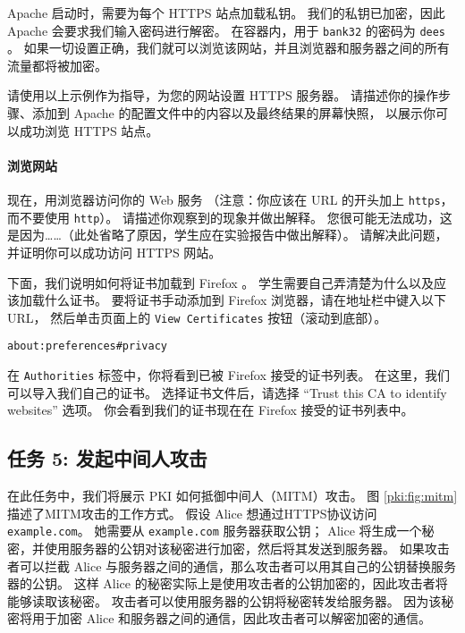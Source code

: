 Apache 启动时，需要为每个 HTTPS 站点加载私钥。
我们的私钥已加密，因此 Apache 会要求我们输入密码进行解密。
在容器内，用于 \texttt{bank32} 的密码为 \texttt{dees} 。
如果一切设置正确，我们就可以浏览该网站，并且浏览器和服务器之间的所有流量都将被加密。

请使用以上示例作为指导，为您的网站设置 HTTPS 服务器。
请描述你的操作步骤、添加到 Apache 的配置文件中的内容以及最终结果的屏幕快照，
以展示你可以成功浏览 HTTPS 站点。

\paragraph{浏览网站}
现在，用浏览器访问你的 Web 服务
（注意：你应该在 URL 的开头加上 \texttt{https}，而不要使用 \texttt{http}）。
请描述你观察到的现象并做出解释。
您很可能无法成功，这是因为……（此处省略了原因，学生应在实验报告中做出解释）。
请解决此问题，并证明你可以成功访问 HTTPS 网站。

下面，我们说明如何将证书加载到 Firefox 。
学生需要自己弄清楚为什么以及应该加载什么证书。
要将证书手动添加到 Firefox 浏览器，请在地址栏中键入以下URL，
然后单击页面上的 \texttt{View Certificates} 按钮（滚动到底部）。

\begin{lstlisting}
about:preferences#privacy
\end{lstlisting}

在 \texttt{Authorities} 标签中，你将看到已被 Firefox 接受的证书列表。
在这里，我们可以导入我们自己的证书。
选择证书文件后，请选择 ``Trust this CA to identify websites'' 选项。
你会看到我们的证书现在在 Firefox 接受的证书列表中。



\subsection{任务 5: 发起中间人攻击}

在此任务中，我们将展示 PKI 如何抵御中间人（MITM）攻击。
图 \ref{pki:fig:mitm} 描述了MITM攻击的工作方式。
假设 Alice 想通过HTTPS协议访问 \texttt{example.com}。
她需要从 \texttt{example.com} 服务器获取公钥； Alice 将生成一个秘密，并使用服务器的公钥对该秘密进行加密，然后将其发送到服务器。
如果攻击者可以拦截 Alice 与服务器之间的通信，那么攻击者可以用其自己的公钥替换服务器的公钥。
这样 Alice 的秘密实际上是使用攻击者的公钥加密的，因此攻击者将能够读取该秘密。
攻击者可以使用服务器的公钥将秘密转发给服务器。
因为该秘密将用于加密 Alice 和服务器之间的通信，因此攻击者可以解密加密的通信。


